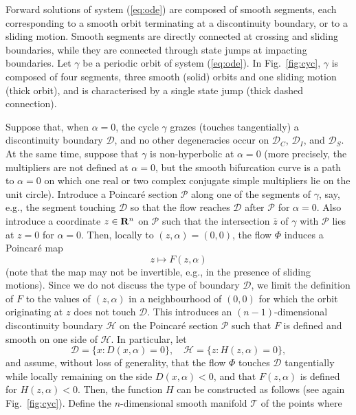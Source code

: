 \documentclass[final,onefignum]{siamltex}
\begin{document}
Forward solutions of system (\ref{eq:ode}) are composed of smooth segments,
each corresponding to a smooth orbit terminating at a discontinuity boundary,
or to a sliding motion. Smooth segments are directly connected at crossing
and sliding boundaries, while they are connected through state jumps at
impacting boundaries.
Let $\gamma$ be a periodic orbit of system (\ref{eq:ode}).
In Fig.~\ref{fig:cyc}, $\gamma$ is composed of four segments, three smooth
(solid) orbits and one sliding motion (thick orbit),
and is characterised by a single state jump (thick dashed connection).

Suppose that, when $\alpha=0$, the cycle $\gamma$ grazes (touches tangentially) a
discontinuity boundary $\mathcal{D}$, and no other degeneracies occur on
$\mathcal{D}_C$, $\mathcal{D}_I$, and $\mathcal{D}_S$.  At the same time, suppose that $\gamma$  is non-hyperbolic at $\alpha=0$ (more precisely, the multipliers are not defined at $\alpha=0$, but the smooth bifurcation curve is a path to $\alpha=0$ on which one real or two complex conjugate simple multipliers lie on the unit circle).
Introduce a Poincar\'e section $\mathcal{P}$ along one of the segments of
$\gamma$, say, e.g., the segment touching $\mathcal{D}$ so that the
flow reaches $\mathcal{D}$ after $\mathcal{P}$ for $\alpha=0$.
Also introduce a coordinate $z\in{{\bf R}}^n$ on $\mathcal{P}$ such that the
intersection $\bar{z}$ of $\gamma$ with $\mathcal{P}$ lies at $z=0$
for $\alpha=0$.
Then, locally to $(z,\alpha)=(0,0)$, the flow $\Phi$ induces a Poincar\'e map
\begin{equation}
\label{eq:pm}
z\mapsto F(z,\alpha)
\end{equation}
(note that the map may not be invertible, e.g., in the presence of sliding motions).  Since we do not discuss the type of boundary $\mathcal{D}$, we limit the definition of $F$ to the values of $(z,\alpha)$ in a neighbourhood of $(0,0)$ for which the orbit originating at $z$ does not touch $\mathcal{D}$.
This introduces an $(n-1)$-dimensional discontinuity boundary $\mathcal{H}$ on the Poincar\'e section $\mathcal{P}$ such that $F$ is defined and smooth on one side of $\mathcal{H}$. In particular, let
$$
\mathcal{D}=\{x:D(x,\alpha)=0\},\quad \mathcal{H}=\{z:H(z,\alpha)=0\},
$$
and assume, without loss of generality, that the flow $\Phi$ touches
$\mathcal{D}$ tangentially while locally remaining on the side $D(x,\alpha)<0$,
and that $F(z,\alpha)$ is defined for $H(z,\alpha)<0$.
Then, the function $H$ can be constructed as follows
(see again Fig.~\ref{fig:cyc}).
Define the $n$-dimensional smooth manifold $\mathcal{T}$ of the points where
\end{document}

